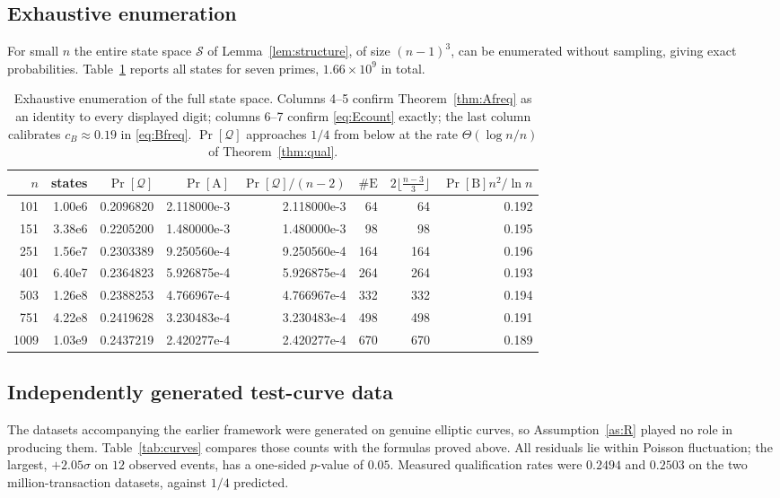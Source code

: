 \documentclass[11pt,a4paper]{article}
\theoremstyle{plain}
\theoremstyle{definition}
\theoremstyle{remark}
\newcommand{\Qu}{\mathcal{Q}}
\newcommand{\Pro}{\Pr}
\newcommand{\clA}{\mathrm{A}}
\newcommand{\clB}{\mathrm{B}}
\newcommand{\clE}{\mathrm{E}}
\begin{document}
\subsection{Exhaustive enumeration}

For small $n$ the entire state space $\mathcal{S}$ of Lemma~\ref{lem:structure}, of size
$(n-1)^{3}$, can be enumerated without sampling, giving exact probabilities. Table~\ref{tab:exh}
reports all states for seven primes, $1.66\times10^{9}$ in total.

\begin{table}[t]
\centering\small
\begin{tabular}{rrrrrrrr}
\toprule
$n$ & states & $\Pro[\Qu]$ & $\Pro[\clA]$ & $\Pro[\Qu]/(n-2)$ & $\#\clE$ & $2\lfloor\frac{n-3}{3}\rfloor$ & $\Pro[\clB]n^{2}/\ln n$\\
\midrule
101 & 1.00e6 & 0.2096820 & 2.118000e{-}3 & 2.118000e{-}3 & 64 & 64 & 0.192\\
151 & 3.38e6 & 0.2205200 & 1.480000e{-}3 & 1.480000e{-}3 & 98 & 98 & 0.195\\
251 & 1.56e7 & 0.2303389 & 9.250560e{-}4 & 9.250560e{-}4 & 164 & 164 & 0.196\\
401 & 6.40e7 & 0.2364823 & 5.926875e{-}4 & 5.926875e{-}4 & 264 & 264 & 0.193\\
503 & 1.26e8 & 0.2388253 & 4.766967e{-}4 & 4.766967e{-}4 & 332 & 332 & 0.194\\
751 & 4.22e8 & 0.2419628 & 3.230483e{-}4 & 3.230483e{-}4 & 498 & 498 & 0.191\\
1009 & 1.03e9 & 0.2437219 & 2.420277e{-}4 & 2.420277e{-}4 & 670 & 670 & 0.189\\
\bottomrule
\end{tabular}
\caption{Exhaustive enumeration of the full state space. Columns 4--5 confirm
Theorem~\ref{thm:Afreq} as an identity to every displayed digit; columns 6--7 confirm
\eqref{eq:Ecount} exactly; the last column calibrates $c_B \approx 0.19$ in \eqref{eq:Bfreq}.
$\Pro[\Qu]$ approaches $1/4$ from below at the rate $\Theta(\log n/n)$ of
Theorem~\ref{thm:qual}.}
\label{tab:exh}
\end{table}

\subsection{Independently generated test-curve data}

The datasets accompanying the earlier framework were generated on genuine elliptic curves, so
Assumption~\ref{as:R} played no role in producing them. Table~\ref{tab:curves} compares those
counts with the formulas proved above. All residuals lie within Poisson fluctuation; the largest,
$+2.05\sigma$ on $12$ observed events, has a one-sided $p$-value of $0.05$. Measured qualification
rates were $0.2494$ and $0.2503$ on the two million-transaction datasets, against $1/4$ predicted.
\end{document}
